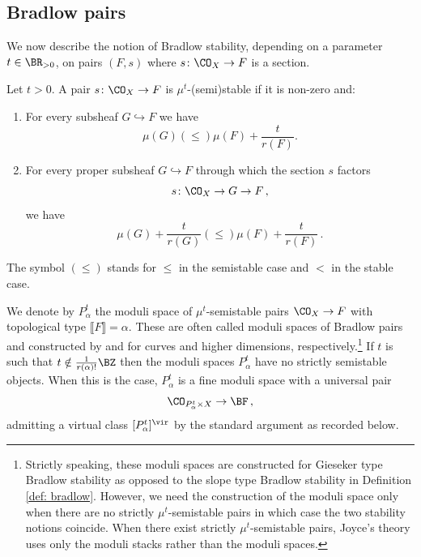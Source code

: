 \subsection{Bradlow pairs}
\label{sec: Bradlowpairs}
We now describe the notion of Bradlow stability,  depending on a parameter $t\in \BR_{>0}$, on pairs $(F, s)$ where $s\colon \CO_X\to F$ is a section.

\begin{definition}
\notready\label{def: bradlow}
Let $t> 0$. A pair $s\colon \CO_X\to F$ is $\mu^{t}$-(semi)stable if it is non-zero and:
\begin{enumerate}
    \item For every subsheaf $G\hookrightarrow F$ we have
    \[\mu(G)(\leq)\mu(F)+\frac{t}{r(F)}.\]
    \item For every proper subsheaf $G\hookrightarrow F$ through which the section $s$ factors \[s\colon \CO_X\to G\to F\,,\] we have
    \[\mu(G)+\frac{t}{r(G)}(\leq) \mu(F)+\frac{t}{r(F)}\,.\]
\end{enumerate}
The symbol $(\leq)$ stands for $\leq$ in the semistable case and $<$ in the stable case.
\end{definition}
 We denote by $P_\alpha^t$ the moduli space of $\mu^t$-semistable pairs $\CO_X\to F$ with topological type $\llbracket F\rrbracket=\alpha$. These are often called moduli spaces of Bradlow pairs and constructed by \cite[Section 1]{thaddeus} and \cite{LeP,lin} for curves and higher dimensions, respectively.\footnote{Strictly speaking, these moduli spaces are constructed for Gieseker type Bradlow stability as opposed to the slope type Bradlow stability in Definition \ref{def: bradlow}. However, we need the construction of the moduli space only when there are no strictly $\mu^t$-semistable pairs in which case the two stability notions coincide. When there exist strictly $\mu^t$-semistable pairs, Joyce's theory \cite{Jo21} uses only the moduli stacks rather than the moduli spaces.} If $t$ is such that $t\notin \frac{1}{r(\alpha)!}\BZ$ then the moduli spaces $P_{\alpha}^t$ have no strictly semistable objects. When this is the case, $P_\alpha^t$ is a fine moduli space with a universal pair \[\CO_{P_\alpha^t\times X}\to \BF\,,\] admitting a virtual class $[P_\alpha^t]^\vir$ by the standard argument as recorded below.

